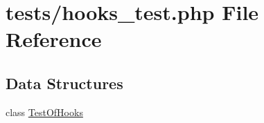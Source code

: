 \hypertarget{hooks__test_8php}{\section{tests/hooks\-\_\-test.php File Reference}
\label{hooks__test_8php}
}
\subsection*{Data Structures}
\begin{DoxyCompactItemize}
\item 
class \hyperlink{class_test_of_hooks}{Test\-Of\-Hooks}
\end{DoxyCompactItemize}
